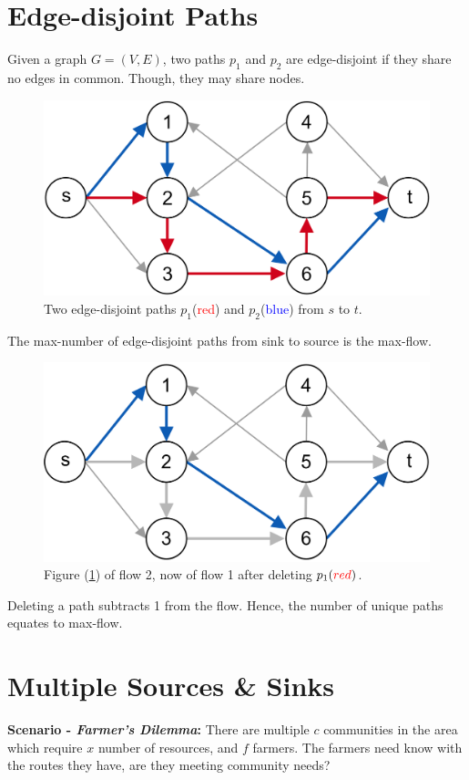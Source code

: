 \vspace{-1.5em}
\section{Edge-disjoint Paths}
\begin{Def}

    Given a graph $G=(V,E)$, two paths $p_1$ and $p_2$ are edge-disjoint if they share no edges in common. Though, 
    they may share nodes.
\end{Def}

\vspace{-.5em}
\begin{figure}[h]
    \centering
    \includegraphics[width=.4\textwidth]{Sections/net/dis.png}
    \caption{Two edge-disjoint paths $p_1$(\textcolor{red}{red}) and $p_2$(\textcolor{blue}{blue}) from $s$ to $t$.}
    \label{fig:dis}
\end{figure}

\vspace{-.5em}
\begin{theo}

    The max-number of edge-disjoint paths from sink to source is the max-flow.
\end{theo}

\vspace{-1em}
\begin{figure}[h]
    \centering
    \includegraphics[width=.4\textwidth]{Sections/net/resdis.png}
    \caption{Figure (\ref{fig:dis}) of flow 2, now of flow 1 after deleting $p_1(\textcolor{red}{red})$.}
\end{figure}

\noindent
Deleting a path subtracts 1 from the flow. Hence, the number of unique paths equates to max-flow.
\newpage 
\section{Multiple Sources \& Sinks}
\textbf{Scenario - \textit{Farmer's Dilemma}:} There are multiple $c$ communities in the area
which require $x$ number of resources, and $f$ farmers. The farmers need know with the routes they have,
are they meeting community needs?


